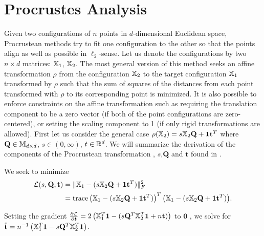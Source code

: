 \documentclass[12pt,oneside,final]{thesis}\usepackage[]{graphicx}\usepackage[]{color}
\begin{document}
\section{Procrustes Analysis}
Given two configurations of $n$ points in $d$-dimensional Euclidean space, Procrustean methods try to fit one configuration to the other so that the points align as well as possible in $\ell_2$-sense. Let us denote the configurations by two $n \times d$ matrices: ${\mathbb{X}}_1$, ${\mathbb{X}}_2$. The most general version of this  method  seeks an affine transformation $\rho$ from the configuration ${\mathbb{X}}_2$  to the target configuration ${\mathbb{X}}_1$  transformed by $\rho$ such that the sum of squares of the distances from each point transformed with $\rho$ to its corresponding point is minimized.
It is also possible to  enforce constraints on the affine transformation such as requiring the translation component to be a zero vector (if both of the point configurations are zero-centered), or setting the scaling component to 1 (if only rigid transformations are allowed). First let us consider the general case  $\rho({{\mathbb{X}}_2}) = s{\mathbb{X}}_2\mathbf{Q}+\mbox{{\bf 1}}\mathbf{t}^T$ where $\mathbf{Q} \in \mathbb{M}_{d\times d}$, $s \in (0,\infty)$, $t\in \mathbb{R}^{d}$. We will summarize the derivation of the components of the Procrustean transformation , $s$,$\mathbf{Q}$ and $\mathbf{t}$ found in \cite{borg+groenen:1997}.

We seek to  minimize 
\begin{align*}
\mathcal{L}(s,\mathbf{Q},\mathbf{t}) &= \|{\mathbb{X}}_1 - (s{\mathbb{X}}_2\mathbf{Q}+\mbox{{\bf 1}} \mathbf{t}^T)\|_F^2  
\\ &= \operatorname{trace} {\left({\mathbb{X}}_1 - (s{\mathbb{X}}_2\mathbf{Q}+\mbox{{\bf 1}} \mathbf{t}^T) \right)^T \left({\mathbb{X}}_1 - (s{\mathbb{X}}_2\mathbf{Q}+\mbox{{\bf 1}} \mathbf{t}^T) \right)}.
\end{align*}

Setting the gradient $\frac{\partial \mathcal{L}}{\partial \bm{t}}=2 \left({\mathbb{X}}_1^T \mbox{{\bf 1}} - (s\mathbf{Q}^T {\mathbb{X}}_2^T \mbox{{\bf 1}}+ n\mathbf{t})\right)$ to $\mathbf{0}$ ,
we solve for $\hat{\mathbf{t}}= n^{-1} \left({\mathbb{X}}_1^T \mbox{{\bf 1}}  -s\mathbf{Q}^T {\mathbb{X}}_2^T \mbox{{\bf 1}} \right)$. 
\end{document}
